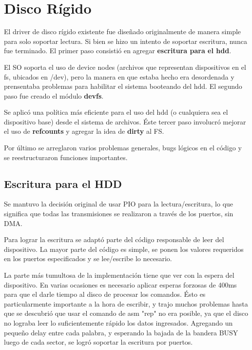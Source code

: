 \section{Disco Rígido}

El driver de disco rígido existente fue diseñado originalmente
de manera simple para solo soportar lectura. Si bien se hizo un intento de
soportar escritura, nunca fue terminado. El primer paso consistió en
agregar \textbf{escritura para el hdd}.

El SO soporta el uso de device nodes (archivos que representan dispositivos en
el fs, ubicados en /dev), pero la manera en que estaba hecho era desordenada y
prensentaba problemas para habilitar el sistema booteando del hdd. El segundo
paso fue creado el módulo \textbf{devfs}.

Se aplicó una política más eficiente para el uso del hdd (o cualquiera sea el
dispositivo base) desde el sistema de archivos. Éste tercer paso involucró
mejorar el uso de \textbf{refcounts} y agregar la idea de \textbf{dirty} al FS.

Por último se arreglaron varios problemas generales, bugs lógicos en el código y
se reestructuraron funciones importantes.

\subsection{Escritura para el HDD}

Se mantuvo la decisión original de usar PIO para la lectura/escritura, lo que
significa que todas las transmisiones se realizaron a través de los puertos, sin
DMA.

Para lograr la escritura se adaptó parte del código responsable de leer del
dispositivo. La mayor parte del código es simple, se ponen los valores
requeridos en los puertos especificados y se lee/escribe lo necesario.

La parte más tumultosa de la implementación tiene que ver con la espera del
dispositivo. En varias ocasiones es necesario aplicar esperas forzosas de 400ms
para que el darle tiempo al disco de procesar los comandos. Ésto es
particularmente importante a la hora de escribir, y trajo muchos problemas hasta
que se descubrió que usar el comando de asm "rep" no era posible, ya que el
disco no lograba leer lo suficientemente rápido los datos ingresados. Agregando
un pequeño delay entre cada palabra, y esperando la bajada de la bandera BUSY
luego de cada sector, se logró soportar la escritura por puertos.

